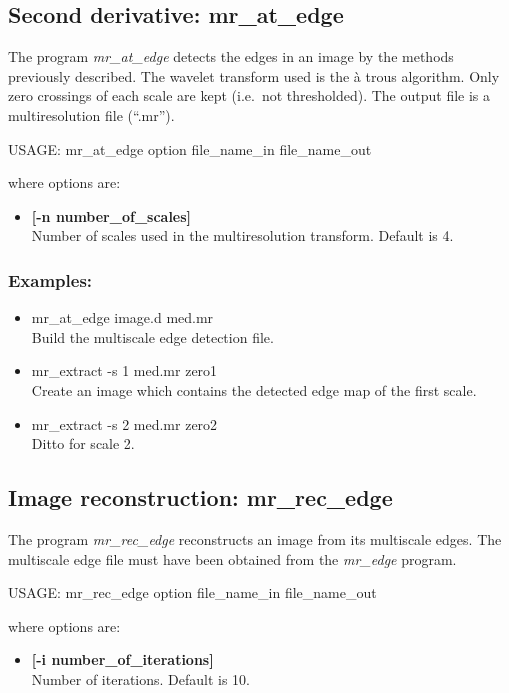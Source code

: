 \subsection{Second derivative: mr\_at\_edge}
The program {\em mr\_at\_edge} detects the edges in an image by the
methods previously described. The wavelet transform used is 
the \`a trous algorithm. Only zero crossings of each scale are
kept (i.e.\ not thresholded).
The output file is a multiresolution
file (``.mr''). 
{\bf
\begin{center}
     USAGE: mr\_at\_edge option file\_name\_in file\_name\_out
\end{center}}
where options are: 
\begin{itemize} 
\item {\bf [-n number\_of\_scales]} \\
Number of scales used in the multiresolution transform.
Default is 4.
\end{itemize} 
\subsubsection*{Examples:}
\begin{itemize} 
\baselineskip=0.4truecm
\itemsep=0.1truecm
\item mr\_at\_edge image.d med.mr \\
Build the multiscale edge detection file.
\item mr\_extract -s 1 med.mr zero1 \\
Create an image which contains the detected edge map of the first scale.
\item mr\_extract -s 2 med.mr zero2 \\
Ditto for scale 2.
\end{itemize} 

\subsection{Image reconstruction: mr\_rec\_edge}
The program {\em mr\_rec\_edge} reconstructs an image from its multiscale
edges. 
The multiscale edge file must have been obtained from the {\em mr\_edge}
program. 
{\bf
\begin{center}
     USAGE: mr\_rec\_edge option file\_name\_in file\_name\_out
\end{center}}
where options are: 
\begin{itemize} 
\item {\bf [-i number\_of\_iterations]} \\
Number of iterations.
Default is 10.
\end{itemize} 


